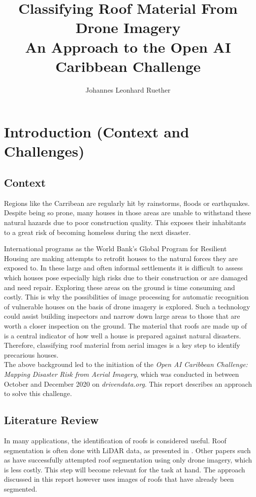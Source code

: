 \documentclass[11pt]{article}
\title{\bf{Classifying Roof Material From Drone Imagery} \\
 An Approach to the Open AI Caribbean Challenge}
\author{Johannes Leonhard Ruether}
\begin{document}
	\maketitle
	
	\section{Introduction (Context and Challenges)}
	
	\subsection{Context}
	
	Regions like the Carribean are regularly hit by rainstorms, floods or earthquakes. Despite being so prone, many houses in those areas are unable to withstand these natural hazards due to poor construction quality. This exposes their inhabitants to a great risk of becoming homeless during the next disaster. 
	
	International programs as the World Bank's Global Program for Resilient Housing are making attempts to retrofit houses to the natural forces they are exposed to. In these large and often informal settlements it is difficult to assess which houses pose especially high risks due to their construction or are damaged and need repair. Exploring these areas on the ground is time consuming and costly. 
	This is why the possibilities of image processing for automatic recognition of vulnerable houses on the basis of drone imagery is explored. Such a technology could assist building inspectors and narrow down large areas to those that are worth a closer inspection on the ground. 
	The material that roofs are made up of is a central indicator of how well a house is prepared against natural disasters. Therefore, classifying roof material from aerial images is a key step to identify precarious houses. \\
	
	The above background led to the initiation of the \textit{Open AI Caribbean Challenge: Mapping Disaster Risk from Aerial Imagery}, which was conducted in between October and December 2020 on \textit{drivendata.org}. This report describes an approach to solve this challenge.
	
	\subsection{Literature Review}
	
	In many applications, the identification of roofs is considered useful. Roof segmentation is often done with LiDAR data, as presented in \cite{Chen2012}. Other papers such as \cite{Soman2019} have successfully attempted roof segmentation using only drone imagery, which is less costly. This step will become relevant for the task at hand. The approach discussed in this report however uses images of roofs that have already been segmented.\\
	
\end{document}
